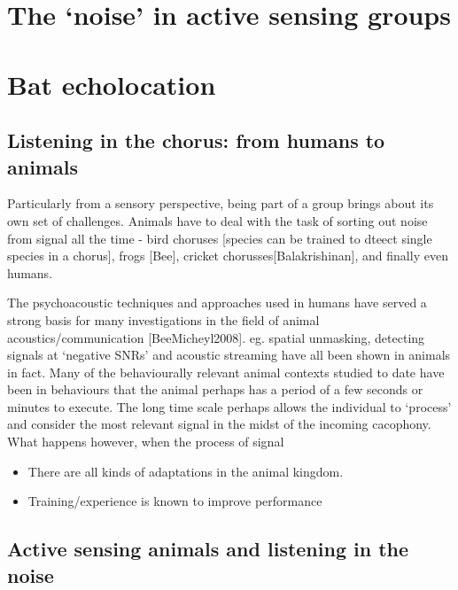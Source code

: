 \documentclass[
]{book}
\providecommand{\tightlist}{%
  \setlength{\itemsep}{0pt}\setlength{\parskip}{0pt}}
\begin{document}
\hypertarget{the-noise-in-active-sensing-groups}{%
\section{The `noise' in active sensing groups}\label{the-noise-in-active-sensing-groups}}

\hypertarget{bat-echolocation}{%
\section{Bat echolocation}\label{bat-echolocation}}

\hypertarget{listening-in-the-chorus-from-humans-to-animals}{%
\subsection{Listening in the chorus: from humans to animals}\label{listening-in-the-chorus-from-humans-to-animals}}

Particularly from a sensory perspective, being part of a group brings about its own set of challenges.
Animals have to deal with the task of sorting out noise from signal all the time - bird choruses {[}species can be trained to dteect single species in a chorus{]}, frogs {[}Bee{]}, cricket chorusses{[}Balakrishinan{]}, and finally even humans.

The psychoacoustic techniques and approaches used in humans have served a strong basis for many investigations in the field of animal acoustics/communication {[}BeeMicheyl2008{]}. eg. spatial unmasking, detecting signals at `negative SNRs' and acoustic streaming have all been shown in animals in fact. Many of the behaviourally relevant animal contexts studied to date have been in behaviours that the animal perhaps has a period of a few seconds or minutes to execute. The long time scale perhaps allows the individual to `process' and consider the most relevant signal in the midst of the incoming cacophony. What happens however, when the process of signal

\begin{itemize}
\tightlist
\item
  There are all kinds of adaptations in the animal kingdom.
\item
  Training/experience is known to improve performance
\end{itemize}

\hypertarget{active-sensing-animals-and-listening-in-the-noise}{%
\subsection{Active sensing animals and listening in the noise}\label{active-sensing-animals-and-listening-in-the-noise}}
\end{document}
